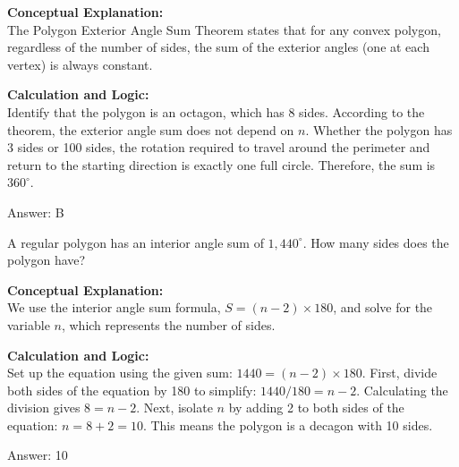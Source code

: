 \documentclass[11pt,paper=a4,answers]{exam}
\begin{document}
\begin{questions}
\begin{solution}
\textbf{Conceptual Explanation:} \\
The Polygon Exterior Angle Sum Theorem states that for any convex polygon, regardless of the number of sides, the sum of the exterior angles (one at each vertex) is always constant.

\vspace{30pt}

\textbf{Calculation and Logic:} \\
Identify that the polygon is an octagon, which has 8 sides. According to the theorem, the exterior angle sum does not depend on $n$. Whether the polygon has 3 sides or 100 sides, the rotation required to travel around the perimeter and return to the starting direction is exactly one full circle. Therefore, the sum is $360^\circ$.

\vspace{30pt}

Answer: \colorbox{yellow!100}{B}
\end{solution}

\vspace{60pt}

\question
A regular polygon has an interior angle sum of $1,440^\circ$. How many sides does the polygon have?

\begin{solution}
\textbf{Conceptual Explanation:} \\
We use the interior angle sum formula, $S = (n - 2) \times 180$, and solve for the variable $n$, which represents the number of sides.

\vspace{30pt}

\textbf{Calculation and Logic:} \\
Set up the equation using the given sum: $1440 = (n - 2) \times 180$. First, divide both sides of the equation by 180 to simplify: $1440 / 180 = n - 2$. Calculating the division gives $8 = n - 2$. Next, isolate $n$ by adding 2 to both sides of the equation: $n = 8 + 2 = 10$. This means the polygon is a decagon with 10 sides.

\vspace{30pt}

Answer: \colorbox{yellow!100}{10}
\end{solution}

\vspace{60pt}


\end{questions}
\end{document}
